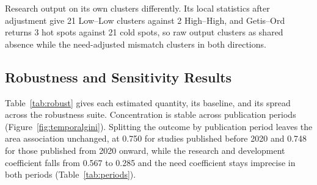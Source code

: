 \documentclass[ASNA,twocolumn]{USG}
\begin{document}
Research output on its own clusters differently. Its local statistics after adjustment give 21
Low--Low clusters against 2 High--High, and Getis--Ord returns 3 hot spots against 21 cold
spots, so raw output clusters as shared absence while the need-adjusted mismatch clusters in
both directions.

\subsection{Robustness and Sensitivity Results}

Table~\ref{tab:robust} gives each estimated quantity, its baseline, and its spread across the
robustness suite. Concentration is stable across publication periods (Figure~\ref{fig:temporalgini}). Splitting
the outcome by publication period leaves the area association unchanged, at 0.750 for studies
published before 2020 and 0.748 for those published from 2020 onward, while the research and development coefficient falls from 0.567 to 0.285 and the need
coefficient stays imprecise in both periods (Table~\ref{tab:periods}).
\end{document}
